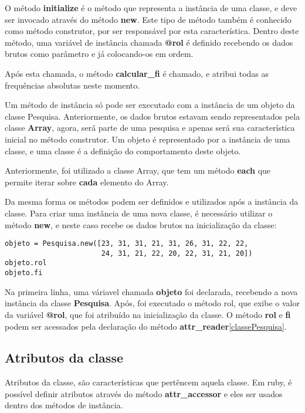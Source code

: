 \documentclass[espaco=simples,appendix=Name]{abnt}
\newcommand{\code}[1] {\textbf{#1}}
\begin{document}
O método \code{initialize} é o método que representa a instância de uma classe, e deve ser invocado através do método \code{new}. Este tipo de método também é conhecido como método construtor, por ser responsável por esta característica. Dentro deste método, uma variável de instância chamada \code{@rol} é definido recebendo os dados brutos como parâmetro e já colocando-os em ordem.

Após esta chamada, o método \code{calcular\_fi} é chamado, e atribui todas as frequências absolutas neste momento. 

Um método de instância só pode ser executado com a instância de um objeto da classe Pesquisa. Anteriormente, os dados brutos estavam sendo representados pela classe \code{Array}, agora, será parte de uma pesquisa e apenas será sua característica inicial no método construtor. Um objeto é representado por a instância de uma classe, e uma classe é a definição do comportamento deste objeto.

Anteriormente, foi utilizado a classe Array, que tem um método \code{each} que permite iterar sobre \code{cada} elemento do Array. 

Da mesma forma os métodos podem ser definidos e utilizados após a instância da classe. Para criar uma instância de uma nova classe, é necessário utilizar o método \code{new}, e neste caso recebe os dados brutos na inicialização da classe:

\begin{lstlisting}[caption=Criando uma classe]
objeto = Pesquisa.new([23, 31, 31, 21, 31, 26, 31, 22, 22, 
                       24, 31, 21, 22, 20, 22, 31, 21, 20])
objeto.rol
objeto.fi
\end{lstlisting}

Na primeira linha, uma váriavel chamada \code{objeto} foi declarada, recebendo a nova instância da classe \code{Pesquisa}. Após, foi executado o método rol, que exibe o valor da variável \code{@rol}, que foi atribuído na inicialização da classe. O método \code{rol} e \code{fi} podem ser acessados pela declaração do método \code{attr\_reader}\ref{classePesquisa}. 

\subsection{ Atributos da classe }

Atributos da classe, são características que pertêncem aquela classe. Em ruby, é possível definir atributos através do método \code{attr\_accessor} e eles ser usados dentro dos métodos de instância.
\end{document}
